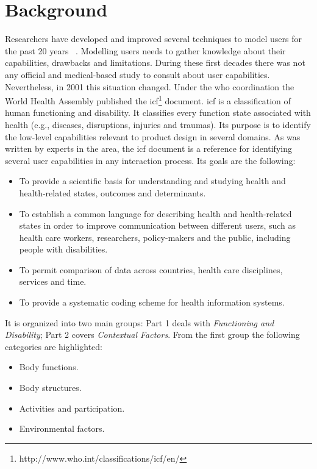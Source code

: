 \section{Background}
\label{sec:background}

Researchers have developed and improved several techniques to model users for 
the past 20 years~\citep{petrelli_user_centered_1999} \citep{fink_adaptable_1997}. 
Modelling users needs to gather knowledge about their capabilities, drawbacks and 
limitations. During these first decades there was not any official and medical-based 
study to consult about user capabilities. Nevertheless, in 2001 this situation 
changed. Under the \ac{who} coordination the World Health Assembly published the
\ac{icf}\footnote{http://www.who.int/classifications/icf/en/} document. 
\ac{icf} is a classification of human functioning and disability. It classifies 
every function state associated with health (e.g., diseases, disruptions, injuries 
and traumas). Its purpose is to identify the low-level capabilities relevant to 
product design in several domains. As was written by experts in the area, the 
\ac{icf} document is a reference for identifying several user capabilities in any 
interaction process. Its goals are the following:

\begin{itemize}
  \item To provide a scientific basis for understanding and studying health and
  health-related states, outcomes and determinants.
  \item To establish a common language for describing health and health-related 
  states in order to improve communication between different users, such as health 
  care workers, researchers, policy-makers and the public, including people with 
  disabilities.
  \item To permit comparison of data across countries, health care disciplines,
  services and time.
  \item To provide a systematic coding scheme for health information systems.
\end{itemize}

It is organized into two main groups: Part 1 deals with \textit{Functioning and
Disability}; Part 2 covers \textit{Contextual Factors}. From the first group the 
following categories are highlighted:

\begin{itemize}
  \item Body functions.
  \item Body structures.
  \item Activities and participation.
  \item Environmental factors.
\end{itemize}

